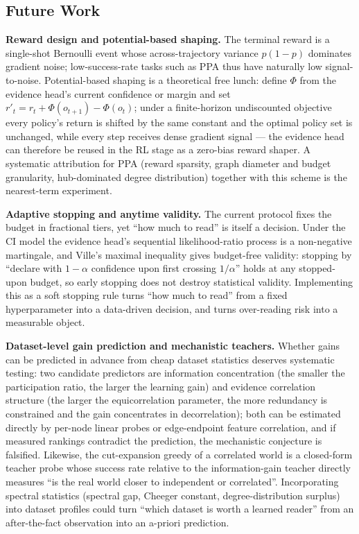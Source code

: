 \documentclass{article}
\begin{document}
\subsection{Future Work}
\label{subsec:future}

\textbf{Reward design and potential-based shaping.} The terminal reward is a single-shot Bernoulli event whose across-trajectory variance $p(1-p)$ dominates gradient noise; low-success-rate tasks such as PPA thus have naturally low signal-to-noise. Potential-based shaping is a theoretical free lunch: define $\Phi$ from the evidence head's current confidence or margin and set $r'_t=r_t+\Phi(o_{t+1})-\Phi(o_t)$; under a finite-horizon undiscounted objective every policy's return is shifted by the same constant and the optimal policy set is unchanged, while every step receives dense gradient signal --- the evidence head can therefore be reused in the RL stage as a zero-bias reward shaper. A systematic attribution for PPA (reward sparsity, graph diameter and budget granularity, hub-dominated degree distribution) together with this scheme is the nearest-term experiment.

\textbf{Adaptive stopping and anytime validity.} The current protocol fixes the budget in fractional tiers, yet ``how much to read'' is itself a decision. Under the CI model the evidence head's sequential likelihood-ratio process is a non-negative martingale, and Ville's maximal inequality gives budget-free validity: stopping by ``declare with $1-\alpha$ confidence upon first crossing $1/\alpha$'' holds at any stopped-upon budget, so early stopping does not destroy statistical validity. Implementing this as a soft stopping rule turns ``how much to read'' from a fixed hyperparameter into a data-driven decision, and turns over-reading risk into a measurable object.

\textbf{Dataset-level gain prediction and mechanistic teachers.} Whether gains can be predicted in advance from cheap dataset statistics deserves systematic testing: two candidate predictors are information concentration (the smaller the participation ratio, the larger the learning gain) and evidence correlation structure (the larger the equicorrelation parameter, the more redundancy is constrained and the gain concentrates in decorrelation); both can be estimated directly by per-node linear probes or edge-endpoint feature correlation, and if measured rankings contradict the prediction, the mechanistic conjecture is falsified. Likewise, the cut-expansion greedy of a correlated world is a closed-form teacher probe whose success rate relative to the information-gain teacher directly measures ``is the real world closer to independent or correlated''. Incorporating spectral statistics (spectral gap, Cheeger constant, degree-distribution surplus) into dataset profiles could turn ``which dataset is worth a learned reader'' from an after-the-fact observation into an a-priori prediction.
\end{document}
